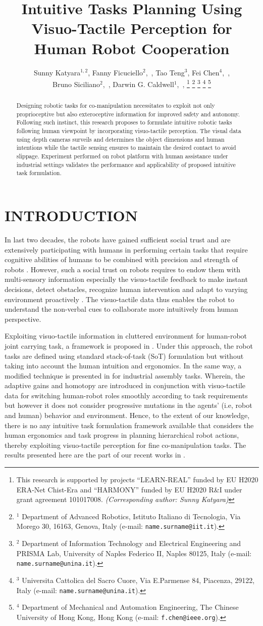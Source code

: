 \documentclass[letterpaper, 10 pt, conference]{ieeeconf}  %
\title{\LARGE \bf
Intuitive Tasks Planning Using Visuo-Tactile Perception for Human Robot Cooperation
}
\author{Sunny Katyara$^{1,2}$, Fanny Ficuciello$^{2}$,~\IEEEmembership{Senior Member,~IEEE}, Tao Teng$^{3}$, Fei Chen$^{4}$,~\IEEEmembership{Senior Member,~IEEE}, \\
Bruno Siciliano$^{2}$,~\IEEEmembership{Fellow,~IEEE},  Darwin G. Caldwell$^{1}$,~\IEEEmembership{Senior Member,~IEEE}, %
\thanks{This research is supported by projects ``LEARN-REAL'' funded by EU H2020 ERA-Net Chist-Era and ``HARMONY'' funded by EU H2020 R\&I under grant agreement 101017008. \textit{(Corresponding author: Sunny Katyara)} }
\thanks{$^{1}$ Department of Advanced Robotics, Istituto Italiano di Tecnologia, Via Morego 30, 16163, Genova, Italy (e-mail: {\tt\small name.surname@iit.it}).}
\thanks{$^{2}$ Department of Information Technology and Electrical Engineering and PRISMA Lab, University of Naples Federico II, Naples 80125, Italy ({e-mail: \tt\small name.surname@unina.it}).}
\thanks{$^{3}$ Universita Cattolica del Sacro Cuore, Via E.Parmense 84, Piacenza, 29122, Italy ({e-mail: \tt\small name.surname@unina.it}).}
\thanks{$^{4}$ Department of Mechanical and Automation Engineering, The Chinese University of Hong Kong, Hong Kong ({e-mail: \tt\small f.chen@ieee.org}).}
}
\begin{document}
\maketitle
\thispagestyle{empty}
\pagestyle{empty}


\begin{abstract}

Designing robotic tasks for co-manipulation necessitates to exploit not only proprioceptive but also exteroceptive information for improved safety and autonomy. Following such instinct, this research proposes to formulate intuitive robotic tasks following human viewpoint by incorporating visuo-tactile perception. The visual data using depth cameras surveils and determines the object dimensions and human intentions while the tactile sensing ensures to maintain the desired contact to avoid slippage. Experiment performed on robot platform with human assistance under industrial settings validates the performance and applicability of proposed intuitive task formulation.    

\end{abstract}


\section{INTRODUCTION}

In last two decades, the robots have gained sufficient social trust and are extensively participating with humans in performing certain tasks that require cognitive abilities of humans to be combined with precision and strength of robots \cite{c1}\cite{c2}. However, such a social trust on robots requires to endow them with multi-sensory information especially the visuo-tactile feedback to make instant decisions, detect obstacles, recognize human intervention and adapt to varying environment proactively \cite{c3}\cite{c4}. The visuo-tactile data thus enables the robot to understand the non-verbal cues to collaborate more intuitively from human perspective.

Exploiting visuo-tactile information in cluttered environment for human-robot joint carrying task, a framework is proposed in \cite{c5}. Under this approach, the robot tasks are defined using standard stack-of-task (SoT) formulation but without taking into account the human intuition and ergonomics. In the same way, a modified technique is presented in \cite{c6} for industrial assembly tasks. Wherein, the adaptive gains and homotopy are introduced in conjunction with visuo-tactile data for switching human-robot roles smoothly according to task requirements but however it does not consider progressive mutations in the agents’ (i.e, robot and human) behavior and environment. Hence, to the extent of our knowledge, there is no any intuitive task formulation framework available that considers the human ergonomics and task progress in planning hierarchical robot actions, thereby exploiting visuo-tactile perception for fine co-manipulation tasks. The results presented here are the part of our recent works in \cite{c7}\cite{c8}. 
\end{document}
